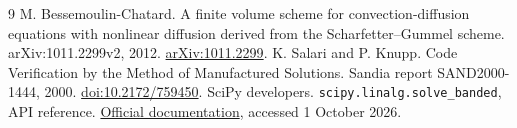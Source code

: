 \documentclass[11pt,a4paper]{article}
\begin{document}
\begin{thebibliography}{9}\small
{} M. Bessemoulin-Chatard. A finite volume scheme for
convection-diffusion equations with nonlinear diffusion derived from the
Scharfetter--Gummel scheme. arXiv:1011.2299v2, 2012.
\href{https://arxiv.org/abs/1011.2299}{arXiv:1011.2299}.
 K. Salari and P. Knupp. Code Verification by the Method of
Manufactured Solutions. Sandia report SAND2000-1444, 2000.
\href{https://doi.org/10.2172/759450}{doi:10.2172/759450}.
 SciPy developers. \texttt{scipy.linalg.solve\_banded}, API reference.
\href{https://docs.scipy.org/doc/scipy/reference/generated/scipy.linalg.solve_banded.html}{Official documentation}, accessed 1 October 2026.
\end{thebibliography}
\end{document}
